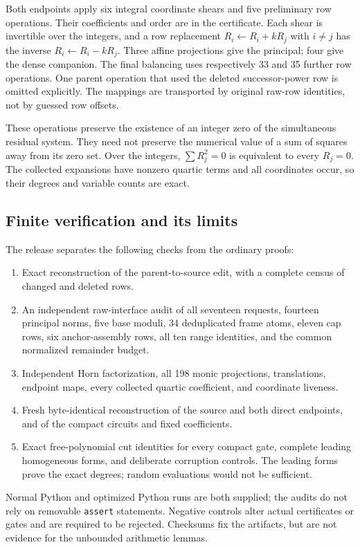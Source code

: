 \documentclass[11pt]{article}
\theoremstyle{definition}
\begin{document}
Both endpoints apply six integral coordinate shears and five
preliminary row operations. Their coefficients and order are in
the certificate. Each shear is invertible over the integers, and
a row replacement $R_i\leftarrow R_i+kR_j$ with $i\ne j$ has
the inverse $R_i\leftarrow R_i-kR_j$. Three affine projections
give the principal; four give the dense companion. The final
balancing uses respectively 33 and 35 further row operations.
One parent operation that used the deleted successor-power row
is omitted explicitly. The mappings are transported by original
raw-row identities, not by guessed row offsets.

These operations preserve the existence of an integer zero of
the simultaneous residual system. They need not preserve the
numerical value of a sum of squares away from its zero set. Over
the integers, $\sum R_j^2=0$ is equivalent to every $R_j=0$.
The collected expansions have nonzero quartic terms and all
coordinates occur, so their degrees and variable counts are exact.

\subsection{Finite verification and its limits}

The release separates the following checks from the ordinary proofs:
\begin{enumerate}
\item Exact reconstruction of the parent-to-source edit, with a
complete census of changed and deleted rows.
\item An independent raw-interface audit of all seventeen requests,
fourteen principal norms, five base moduli, 34 deduplicated frame
atoms, eleven cap rows, six anchor-assembly rows, all ten range
identities, and the common normalized remainder budget.
\item Independent Horn factorization, all 198 monic projections,
translations, endpoint maps, every collected quartic coefficient,
and coordinate liveness.
\item Fresh byte-identical reconstruction of the source and both
direct endpoints, and of the compact circuits and fixed coefficients.
\item Exact free-polynomial cut identities for every compact gate,
complete leading homogeneous forms, and deliberate corruption
controls. The leading forms prove the exact degrees; random
evaluations would not be sufficient.
\end{enumerate}
Normal Python and optimized Python runs are both supplied; the
audits do not rely on removable \texttt{assert} statements.
Negative controls alter actual certificates or gates and are required
to be rejected. Checksums fix the artifacts, but are not evidence
for the unbounded arithmetic lemmas.
\end{document}

